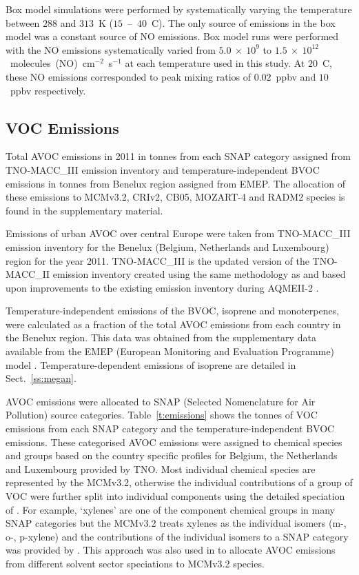 Box model simulations were performed by systematically varying the temperature between $288$ and $313$~K ($15$~--~$40$~\degree C). 
The only source of  emissions in the box model was a constant source of NO emissions. 
Box model runs were performed with the NO emissions systematically varied from $5.0~\times~10^9$ to $1.5~\times~10^{12}$~molecules~(NO)~cm$^{-2}$~s$^{-1}$ at each temperature used in this study. 
At $20$~\degree C, these NO emissions corresponded to peak  mixing ratios of $0.02$~ppbv and $10$~ppbv respectively.

\subsection{VOC Emissions} \label{ss:VOC_emissions}
{%
    \renewcommand{\arraystretch}{1.1}%
    \begin{table}%
        \centering%
        \caption{Total AVOC emissions in 2011 in tonnes from each SNAP category assigned from TNO-MACC\_III emission inventory and temperature-independent BVOC emissions in tonnes from Benelux region assigned from EMEP. The allocation of these emissions to MCMv3.2, CRIv2, CB05, MOZART-4 and RADM2 species is found in the supplementary material.}%
        \label{t:emissions}%
    \end{table}%
}
Emissions of urban AVOC over central Europe were taken from TNO-MACC\_III emission inventory for the Benelux (Belgium, Netherlands and Luxembourg) region for the year 2011.
TNO-MACC\_III is the updated version of the TNO-MACC\_II emission inventory created using the same methodology as \citet{Kuenen:2014} and based upon improvements to the existing emission inventory during AQMEII-2 \citep{Pouliot:2015}. 

Temperature-independent emissions of the BVOC, isoprene and monoterpenes, were calculated as a fraction of the total AVOC emissions from each country in the Benelux region.
This data was obtained from the supplementary data available from the EMEP (European Monitoring and Evaluation Programme) model \citep{Simpson:2012}.
Temperature-dependent emissions of isoprene are detailed in Sect.~\ref{ss:megan}.

AVOC emissions were allocated to SNAP (Selected Nomenclature for Air Pollution) source categories.
Table~\ref{t:emissions} shows the tonnes of VOC emissions from each SNAP category and the temperature-independent BVOC emissions.
These categorised AVOC emissions were assigned to chemical species and groups based on the country specific profiles for Belgium, the Netherlands and Luxembourg provided by TNO.
Most individual chemical species are represented by the MCMv3.2, otherwise the individual contributions of a group of VOC were further split into individual components using the detailed speciation of \citet{Passant:2002}.
For example, `xylenes' are one of the component chemical groups in many SNAP categories but the MCMv3.2 treats xylenes as the individual isomers (m-, o-, p-xylene) and the contributions of the individual isomers to a SNAP category was provided by \citet{Passant:2002}.
This approach was also used in \citet{vonSchneidemesser:2015} to allocate AVOC emissions from different solvent sector speciations to MCMv3.2 species.

